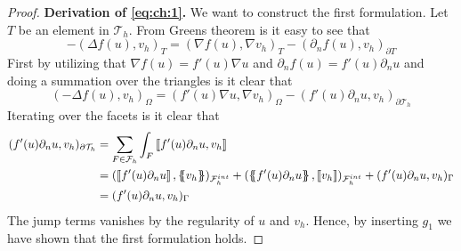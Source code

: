 \begin{proof}

         \textbf{Derivation of \eqref{eq:ch:1}.  }  We want to construct the first formulation. Let $T$ be an element in $\mathcal{T}_{h}$. From Greens theorem is it easy to see that
            \begin{equation}
            \label{eq:1_gr}
-(\Delta f( u) , v_{h})_{T } = (\nabla f( u), \nabla v_{h}  )_{T } - ( \partial _{n}  f( u), v_{h} )_{\partial T }
            \end{equation}
            First by utilizing that $\nabla f( u) = f' ( u) \nabla u $ and $\partial _{n}f( u)  = f' ( u)  \partial _{n}u$  and doing a summation over the triangles  is it clear that \[
            ( -\Delta f( u),v_{h} )_{\Omega  } =(f' ( u) \nabla u, \nabla v_{h}  )_{\Omega  } - (   f' ( u)\partial _{n}u, v_{h} )_{\partial \mathcal{T}_{h}  }
            \]
            Iterating over the facets is it clear that \[
                \begin{split}
            (   f' ( u)\partial _{n}u, v_{h} )_{\partial \mathcal{T}_{h}  } & = \sum_{F \in \mathcal{F}_{h}  }^{} \int_{F}^{}   \jump{ f' ( u)\partial _{n}u, v_{h} } \\
                                                                        & =  ( \jump{ f' ( u) \partial _{n}u },  \mean{v_{h}}    )_{\mathcal{F}^{int}_{h} } + ( \mean{ f' ( u) \partial _{n}u }, \jump{ v_{h} }    )_{\mathcal{F}^{int}_{h} } +  ( f' ( u)
                                                                        \partial _{n}u, v_{h}) _{\Gamma } \\
                                                                        & =  ( f' ( u) \partial _{n}u, v_{h}) _{\Gamma }
                \end{split}
            \]
            The jump terms vanishes by the regularity of $u$ and $v_{h}$. Hence, by inserting $g_{1}$ we have shown that the first formulation holds.


\end{proof}
